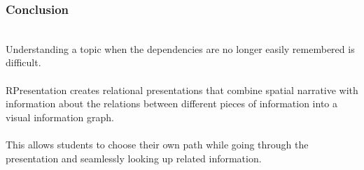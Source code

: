 \begin{frame}
  \frametitle{Conclusion}
  \begin{module}[id=conclusion]\\
\noindent
Understanding a topic when the dependencies are no longer easily remembered is difficult.\\
\\
\noindent
RPresentation creates relational presentations that combine spatial narrative with information about the relations between different pieces of information into a visual information graph.\\
\\
\noindent
This allows students to choose their own path while going through the presentation and seamlessly looking up related information.\\

  \end{module}
\end{frame}
